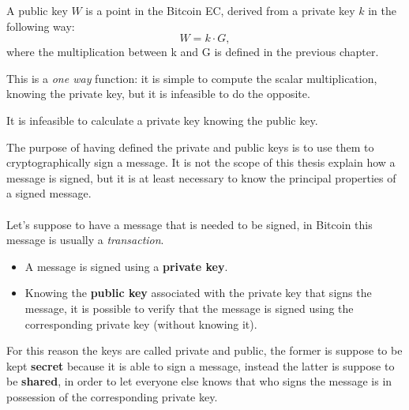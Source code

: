 \begin{definition}
	A public key $W$ is a point in the Bitcoin EC, derived from a private key $k$ in the following way: \\
	\begin{equation}
	W=k\cdot G,
	\end{equation}
	where the multiplication between k and G is defined in the previous chapter.
\end{definition}
This is a \textit{one way} function: it is simple to compute the scalar multiplication, knowing the private key, but it is infeasible to do the opposite.
\begin{remark}
	It is infeasible to calculate a private key knowing the public key.
\end{remark}
The purpose of having defined the private and public keys is to use them to cryptographically sign a message. It is not the scope of this thesis explain how a message is signed, but it is at least necessary to know the principal properties of a signed message.
\\ \\
Let's suppose to have a message that is needed to be signed, in Bitcoin this message is usually a \textit{transaction}.

\begin{itemize}
	\item A message is signed using a \textbf{private key}.
	\item Knowing the \textbf{public key} associated with the private key that signs the message, it is possible to verify that the message is signed using the corresponding private key (without knowing it).
\end{itemize}
For this reason the keys are called private and public, the former is suppose to be kept \textbf{secret} because it is able to sign a message, instead the latter is suppose to be \textbf{shared}, in order to let everyone else knows that who signs the message is in possession of the corresponding private key.





